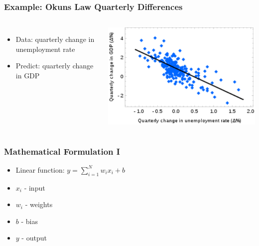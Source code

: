 \begin{frame}
    \frametitle{Example: Okuns Law Quarterly Differences}
    \begin{columns}
            \begin{itemize}
                \item Data: quarterly change in unemployment rate 
                \item Predict: quarterly change in GDP
            \end{itemize}
            \includegraphics[width=1\linewidth]{linreg-pics/lg}\\

    \end{columns}
\end{frame}


\begin{frame}
    \frametitle{Mathematical Formulation I}
            \begin{itemize}
                \item Linear function: $y = \sum_{i=1}^{N} w_i x_i + b$
                \item $x_i$ - input    
                \item $w_i$ - weights 
                \item $b$ - bias
                \item $y$ - output
            \end{itemize}
\end{frame}


